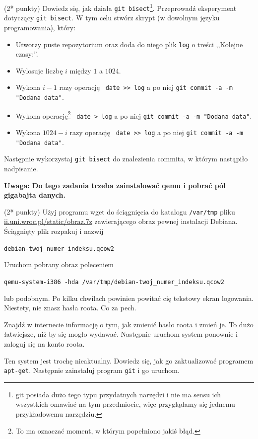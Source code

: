 \begin{zadanie}(2* punkty) Dowiedz się, jak działa \texttt{git bisect}\footnote{git posiada dużo tego typu przydatnych narzędzi i nie ma sensu ich wszystkich omawiać na tym przedmiocie, więc przyglądamy się jednemu przykładowemu narzędziu.}. 
Przeprowadź eksperyment dotyczący \texttt{git bisect}. W tym celu stwórz skrypt (w dowolnym języku programowania), który:
\begin{itemize}
\item Utworzy puste repozytorium oraz doda do niego plik \verb+log+ o treści ,,Kolejne czasy:''.
\item Wylosuje liczbę $i$ między $1$ a $1024$.
\item Wykona $i-1$ razy operację \verb+ date >> log+
 a po niej \verb+git commit -a -m "Dodana data"+.
\item Wykona operację\footnote{
To ma oznaczać moment, w którym popełniono jakiś błąd.
} \verb+ date > log+
 a po niej \verb+git commit -a -m "Dodana data"+.
\item Wykona $1024-i$ razy operację \verb+ date >> log+
 a po niej \verb+git commit -a -m "Dodana data"+. 
\end{itemize}
Następnie wykorzystaj \verb+git bisect+ do znalezienia commita, w którym nastąpiło nadpisanie.
\end{zadanie}

\textbf{Uwaga: Do tego zadania trzeba zainstalować qemu i pobrać pół gigabajta danych.} \begin{zadanie} (2* punkty)
Użyj programu wget do ściągnięcia do katalogu \verb+/var/tmp+ pliku 
\url{ii.uni.wroc.pl/static/obraz.7z} 
zawierającego obraz pewnej instalacji Debiana. Ściągnięty plik rozpakuj i nazwij

\verb+debian-twoj_numer_indeksu.qcow2+

Uruchom pobrany obraz poleceniem

\verb+qemu-system-i386 -hda /var/tmp/debian-twoj_numer_indeksu.qcow2+

lub podobnym. Po kilku chwilach powinien powitać cię tekstowy ekran logowania. Niestety, nie znasz hasła roota. Co za pech.

Znajdź w internecie informację o tym, jak zmienić hasło roota i zmień je. To dużo łatwiejsze, niż by się mogło wydawać. Następnie uruchom system ponownie i zaloguj się na konto roota.

Ten system jest trochę nieaktualny. Dowiedz się, jak go zaktualizować programem \verb+apt-get+. Następnie zainstaluj program \verb+git+ i go uruchom.
\end{zadanie}



